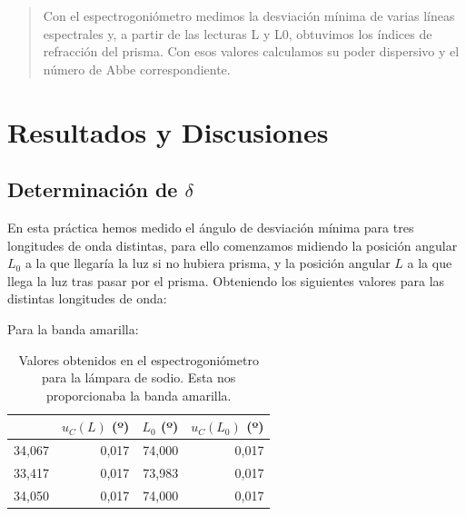\documentclass[10pt,onecolumn]{article}
\begin{document}

\tableofcontents %
\newpage

\HRule{0.5pt} %

\begin{abstract}
Con el espectrogoniómetro medimos la desviación mínima de varias líneas espectrales y, a partir de las lecturas L y L0, obtuvimos los índices de refracción del prisma. Con esos valores calculamos su poder dispersivo y el número de Abbe correspondiente.
\end{abstract}


\section{Resultados y Discusiones}
\subsection{Determinación de $\delta$}
En esta práctica hemos medido el ángulo de desviación mínima para tres longitudes de onda distintas, para ello
comenzamos midiendo la posición angular $L_0$ a la que llegaría la luz si no hubiera prisma,
y la posición angular $L$ a la que llega la luz tras pasar por el prisma. Obteniendo los siguientes valores para las distintas longitudes de onda:

Para la banda amarilla:

\begin{table}[H]
\centering
\begin{tabular}{|r|r|r|r|}
\hline
\rowcolor[rgb]{ .651,  .788,  .925}
\multicolumn{1}{|l|}{$L$ (º)} & \multicolumn{1}{l|}{$u_C(L)$ (º)} & \multicolumn{1}{l|}{$L_0$ (º)} & \multicolumn{1}{l|}{$u_C(L_0)$ (º)} \\ \hline
\rowcolor[rgb]{.816,  .816,  .816} 34,067 & 0,017 & 74,000 & 0,017 \\ \hline
\rowcolor[rgb]{.816,  .816,  .816} 33,417 & 0,017 & 73,983 & 0,017 \\ \hline
\rowcolor[rgb]{.816,  .816,  .816} 34,050 & 0,017 & 74,000 & 0,017 \\ \hline
\end{tabular}
\caption{Valores obtenidos en el espectrogoniómetro para la lámpara de sodio. Esta nos proporcionaba la banda amarilla.}\label{tab:banda_amarilla}
\end{table}
\end{document}
